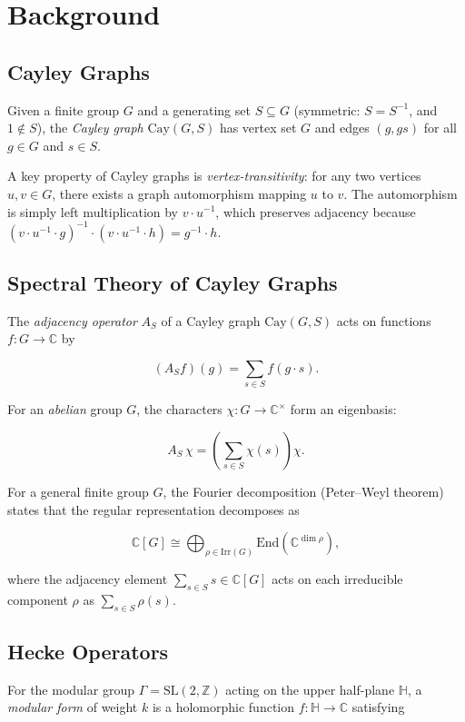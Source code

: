 \documentclass[11pt]{article}
\theoremstyle{plain}
\theoremstyle{definition}
\theoremstyle{remark}
\begin{document}
\section{Background}
\label{sec:background}

\subsection{Cayley Graphs}

Given a finite group $G$ and a generating set $S\subseteq G$ (symmetric: $S=S^{-1}$, and $1\notin S$), the \emph{Cayley graph} $\mathrm{Cay}(G,S)$ has vertex set $G$ and edges $(g, gs)$ for all $g\in G$ and $s\in S$.

A key property of Cayley graphs is \emph{vertex-transitivity}: for any two vertices $u,v\in G$, there exists a graph automorphism mapping $u$ to $v$.
The automorphism is simply left multiplication by $v\cdot u^{-1}$, which preserves adjacency because $(v\cdot u^{-1}\cdot g)^{-1}\cdot (v\cdot u^{-1}\cdot h)=g^{-1}\cdot h$.

\subsection{Spectral Theory of Cayley Graphs}

The \emph{adjacency operator} $A_S$ of a Cayley graph $\mathrm{Cay}(G,S)$ acts on functions $f:G\to\mathbb{C}$ by

\[
(A_S f)(g) = \sum_{s\in S} f(g\cdot s).
\]

For an \emph{abelian} group $G$, the characters $\chi:G\to\mathbb{C}^\times$ form an eigenbasis:

\[
A_S\,\chi = \left(\sum_{s\in S}\chi(s)\right)\chi.
\]

For a general finite group $G$, the Fourier decomposition (Peter--Weyl theorem)~\cite{serre1977linear} states that the regular representation decomposes as

\[
\mathbb{C}[G] \cong \bigoplus_{\rho\in\mathrm{Irr}(G)} \mathrm{End}(\mathbb{C}^{\dim\rho}),
\]

where the adjacency element $\sum_{s\in S} s\in\mathbb{C}[G]$ acts on each irreducible component $\rho$ as $\sum_{s\in S} \rho(s)$.

\subsection{Hecke Operators}

For the modular group $\Gamma = \mathrm{SL}(2,\mathbb{Z})$ acting on the upper half-plane $\mathbb{H}$, a \emph{modular form} of weight $k$ is a holomorphic function $f:\mathbb{H}\to\mathbb{C}$ satisfying
\end{document}
